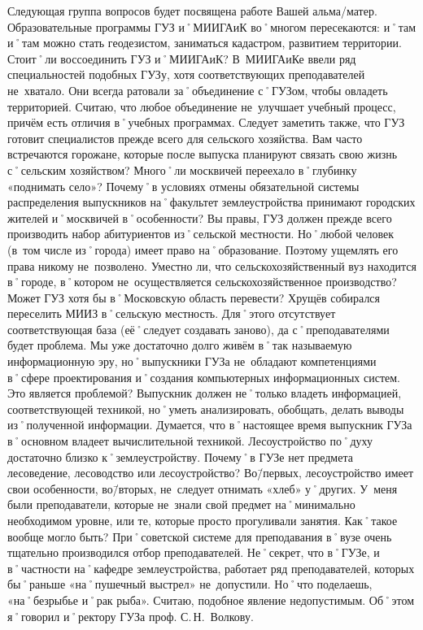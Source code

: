 \begin{drama}
	\maxspeaks Следующая группа вопросов будет посвящена работе Вашей альма\-/матер. Образовательные программы ГУЗ и˚МИИГАиК во˚многом пересекаются: и˚там и˚там можно стать геодезистом, заниматься кадастром, развитием территории. Стоит˚ли воссоединить ГУЗ и˚МИИГАиК? 
	\michaelspeaks В~МИИГАиКе ввели ряд специальностей подобных ГУЗу, хотя соответствующих преподавателей не~хватало. Они всегда ратовали за˚объединение с˚ГУЗом, чтобы овладеть территорией. Считаю, что любое объединение не~улучшает учебный процесс, причём есть отличия в˚учебных программах. Следует заметить также, что ГУЗ готовит специалистов прежде всего для сельского хозяйства.		
	\maxspeaks Вам часто встречаются горожане, которые после выпуска планируют связать свою жизнь с˚сельским хозяйством? Много˚ли москвичей переехало в˚глубинку  «поднимать село»? Почему˚в условиях отмены обязательной системы распределения выпускников на˚факультет землеустройства принимают городских жителей и˚москвичей в˚особенности? 
	\michaelspeaks Вы правы, ГУЗ должен прежде всего производить набор абитуриентов из˚сельской местности. Но˚любой человек (в~том числе из˚города) имеет право на˚образование. Поэтому ущемлять его права никому не~позволено. 
	\maxspeaks Уместно ли, что сельскохозяйственный вуз находится в˚городе, в˚котором не~осуществляется сельскохозяйственное производство? Может ГУЗ хотя бы в˚Московскую область перевести?
	\michaelspeaks Хрущёв собирался переселить МИИЗ в˚сельскую местность. Для˚этого отсутствует соответствующая база (её˚следует создавать заново), да с˚преподавателями будет проблема.
	\maxspeaks Мы уже достаточно долго живём в˚так называемую информационную эру, но˚выпускники ГУЗа не~обладают компетенциями в˚сфере проектирования и˚создания компьютерных информационных систем. Это является проблемой?
	\michaelspeaks Выпускник должен не˚только владеть информацией, соответствующей техникой, но˚уметь анализировать, обобщать, делать выводы из˚полученной информации. Думается, что в˚настоящее время выпускник ГУЗа в˚основном владеет вычислительной техникой.
	\maxspeaks Лесоустройство по˚духу достаточно близко к˚землеустройству. Почему˚в ГУЗе нет предмета лесоведение, лесоводство или лесоустройство?
	\michaelspeaks Во\=/первых, лесоустройство имеет свои особенности, во\=/вторых, не~следует отнимать «хлеб» у˚других.
	\maxspeaks У~меня были преподаватели, которые не~знали свой предмет на˚минимально необходимом уровне, или те, которые просто прогуливали занятия. Как˚такое вообще могло быть? 
	\michaelspeaks При˚советской системе для преподавания в˚вузе очень тщательно производился отбор преподавателей. Не˚секрет, что в˚ГУЗе, и в˚частности на˚кафедре землеустройства, работает ряд преподавателей, которых бы˚раньше «на˚пушечный выстрел» не~допустили. Но˚что поделаешь, «на˚безрыбье и˚рак рыба». Считаю, подобное явление недопустимым. Об˚этом я˚говорил и˚ректору ГУЗа проф. С.\,Н.~Волкову.

\end{drama}
